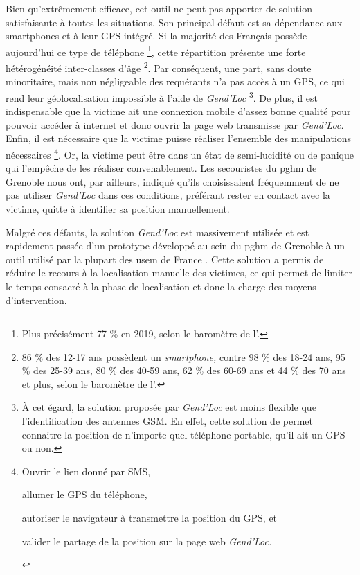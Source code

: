 Bien qu’extrêmement efficace, cet outil ne peut pas apporter de
solution satisfaisante à toutes les situations. Son principal défaut
est sa dépendance aux smartphones et à leur GPS intégré. Si la
majorité des Français possède aujourd'hui ce type de téléphone
\footnote{Plus précisément 77 \% en 2019, selon le baromètre de
  l'\textcite{ARCEP2019}.}, cette répartition présente une forte
hétérogénéité inter-classes d'âge \footnote{86 \% des 12-17 ans
  possèdent un \emph{smartphone,} contre 98 \% des 18-24 ans, 95 \%
  des 25-39 ans, 80 \% des 40-59 ans, 62 \% des 60-69 ans et 44 \% des
  70 ans et plus, selon le baromètre de l'\textcite{ARCEP2019}.}. Par
conséquent, une part, sans doute minoritaire, mais non négligeable des
requérants n'a pas accès à un GPS, ce qui rend leur géolocalisation
impossible à l'aide de \emph{Gend'Loc} \footnote{À cet égard, la
  solution proposée par \emph{Gend'Loc} est moins flexible que
  l'identification des antennes GSM. En effet, cette solution de
  permet connaitre la position de n'importe quel téléphone portable,
  qu'il ait un GPS ou non.}. De plus, il est indispensable que la
victime ait une connexion mobile d'assez bonne qualité pour pouvoir
accéder à internet et donc ouvrir la page web transmisse par
\emph{Gend'Loc.}  Enfin, il est nécessaire que la victime puisse
réaliser l'ensemble des manipulations nécessaires \footnote{%
  \begin{enumerate*}[label=(\arabic*)]
  \item Ouvrir le lien donné par SMS,
  \item allumer le GPS du téléphone,
  \item autoriser le navigateur à transmettre la position du GPS, et
  \item valider le partage de la position sur la page web \emph{Gend'Loc.} 
  \end{enumerate*}}.
%
Or, la victime peut être dans un état de semi-lucidité ou de panique
qui l’empêche de les réaliser convenablement. Les secouristes du
\ac{pghm} de Grenoble nous ont, par ailleurs, indiqué qu'ils
choisissaient fréquemment de ne pas utiliser \emph{Gend'Loc} dans ces
conditions, préférant rester en contact avec la victime, quitte à
identifier sa position manuellement.

Malgré ces défauts, la solution \emph{Gend'Loc} est massivement
utilisée et est rapidement passée d'un prototype développé au sein du
\ac{pghm} de Grenoble à un outil utilisé par la plupart des \ac{usem}
de France \autocite{Muscat2015}. Cette solution a permis de réduire le
recours à la localisation manuelle des victimes, ce qui permet de
limiter le temps consacré à la phase de localisation et donc la charge
des moyens d'intervention.

